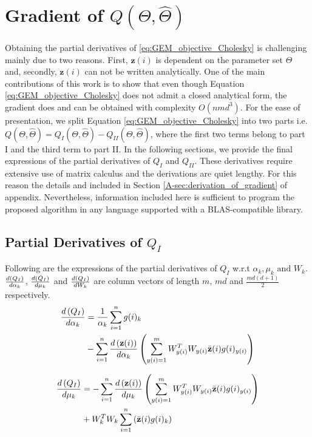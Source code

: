 \documentclass[]{article}
\begin{document}
\section{Gradient of $Q(\Theta,\hat{\Theta})$}\label{sec:Derivatives}
Obtaining the partial derivatives of \eqref{eq:GEM_objective_Cholesky} is challenging mainly due to two reasons. First, $\textbf{z}(i)$ is  dependent on the parameter set $\Theta$ and, secondly, $\textbf{z}(i)$ can not be written analytically. One of the main contributions of this work is to show that even though Equation \ref{eq:GEM_objective_Cholesky} does not admit a closed analytical form, the gradient does and can be obtained with complexity $O(nmd^3)$. For the ease of presentation, we split Equation \ref{eq:GEM_objective_Cholesky} into two parts i.e. $Q(\Theta,\hat{\Theta}) = Q_I(\Theta,\hat{\Theta}) - Q_{II}(\Theta,\hat{\Theta})$, where the first two terms belong to part I and the third term to part II. In the following sections, we provide the final expressions of the partial derivatives of $Q_I$ and $Q_{II}$. These derivatives require extensive use of matrix calculus and the derivations are quiet lengthy.  For this reason the details and included in Section \ref{A-sec:derivation_of_gradient} of appendix. Nevertheless, information included here is sufficient to program the proposed algorithm in any language supported with a BLAS-compatible library.

\subsection{Partial Derivatives of $Q_I$}\label{subsec:QI_partial_deriv}
Following are the expressions of the partial derivatives of $Q_I$ w.r.t ${\alpha_k,\mu_k \text{ and } W_k}$. $\der{\alpha_k}{Q_I}$, $\der{\mu_k}{Q_I}$ and $\der{W_k}{Q_I}$ are column vectors of length $m$, $md$ and $\frac{md(d+1)}{2}$ respectively.
\begin{align}\label{eq:der_QI_alpha}
\der{\alpha_k}{Q_I} &= \frac{1}{\alpha_k}\sum\limits_{i=1}^n  g(i)_k \nonumber  \\
 &- \sum\limits_{i=1}^n \der{\alpha_k}{\textbf{z}(i)} \left(\sum\limits_{y(i)=1}^m  W^T_{y(i)}  W_{y(i)} \zbar{i} g(i)_{y(i)}\right) 
\end{align}


\begin{align}\label{eq:der_QI_mu}
\der{\mu_k}{Q_I} &= -\sum\limits_{i=1}^n \der{\mu_k}{\textbf{z}(i)} \left(\sum\limits_{y(i)=1}^m W^T_{y(i)}W_{y(i)}\zbar{i} g(i)_{y(i)} \right) \nonumber \\
 &+ W^T_k W_k\sum\limits_{i=1}^n  \left(\zbar{i} g(i)_k\right)
\end{align}
\end{document}
